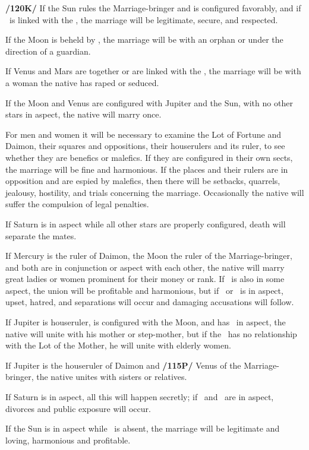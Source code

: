\textbf{/120K/} If the Sun rules the Marriage-bringer and is configured favorably, and if \Jupiter\, is linked with the \Moon, the marriage will be legitimate, secure, and respected. 

If the Moon is beheld by \Saturn, the marriage will be with an orphan or under the direction of a guardian. 

If Venus and Mars are together or are linked with the \Moon, the marriage will be with a woman the native has raped or seduced. 

If the Moon and Venus are configured with Jupiter and the Sun, with no other stars in aspect, the native will marry once.

For men and women it will be necessary to examine the Lot of Fortune and Daimon, their squares and oppositions, their houserulers and its ruler, to see whether they are benefics or malefics. If they are configured in their own sects, the marriage will be fine and harmonious. If the places and their rulers are in opposition and are espied by malefics, then there will be setbacks, quarrels, jealousy, hostility, and trials concerning the marriage. Occasionally the native will suffer the compulsion of legal penalties. 

If Saturn is in aspect while all other stars are properly configured, death will separate the mates. 

If Mercury is the ruler of Daimon, the Moon the ruler of the Marriage-bringer, and both are in conjunction or aspect with each other, the native will marry great ladies or women prominent for their money or rank. If \Jupiter\, is also in some aspect, the union will be profitable and harmonious, but if \Saturn\, or \Mars\, is in aspect, upset, hatred, and separations will occur and damaging accusations will follow. 

If Jupiter is houseruler, is configured with the Moon, and has \Saturn\, in aspect, the native will unite with his mother or step-mother, but if the \Moon\, has no relationship with the Lot of the Mother, he will unite with elderly women. 

If Jupiter is the houseruler of Daimon and \textbf{/115P/} Venus of the Marriage-bringer, the native unites with sisters or relatives.

If Saturn is in aspect, all this will happen secretly; if \Mercury\, and \Mars\, are in aspect, divorces and public exposure will occur. 

If the Sun is in aspect while \Saturn\, is absent, the marriage will be legitimate and loving, harmonious and profitable. 

